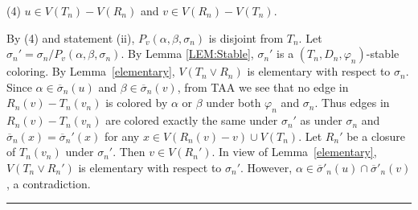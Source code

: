\documentclass[11pt]{article}
\newtheorem{lemma}[theorem]{Lemma}
\newcommand{\TT}{\mathcal {T}}
\newcommand{\phibar}{\overline{\varphi}}
\newcommand{\phiv}{\varphi}
\def\qed{\hfill \rule{4pt}{7pt}}
\begin{document}
(4) $u \in V(T_n)-V(R_n)$ and $v \in V(R_n)-V(T_n)$.
 
By (4) and statement (ii), $P_v(\alpha,\beta,\sigma_n)$ is disjoint from $T_n$. Let $\sigma_n'=\sigma_n/P_v(\alpha,
\beta,\sigma_n)$. By Lemma \ref{LEM:Stable}, $\sigma_n'$ is a $(T_n,D_n,\varphi_n)$-stable coloring.  By Lemma~\ref{elementary},  
$V(T_n\vee R_n)$ is elementary with respect to $\sigma_n$. Since $\alpha \in \overline{\sigma}_n(u)$ and $\beta\in \overline{\sigma}_n(v)$, 
from TAA we see that no edge in $R_n(v)-T_n(v_n)$ is colored by $\alpha$ or $\beta$
under both $\varphi_n$ and $\sigma_n$. Thus edges in $R_n(v)-T_n(v_n)$ are colored exactly the same under 
$\sigma_n'$ as under $\sigma_n$ and $\overline{\sigma}_n(x)= \overline{\sigma}_n'(x)$ for any $x \in  
V(R_n(v)-v) \cup V(T_n)$.  Let $R_n'$ be a closure of $T_n(v_n)$ under $\sigma_n'$. Then $v \in V(R_n')$. In view of 
Lemma~\ref{elementary},  $V(T_n\vee R_n')$ is elementary with respect to $\sigma_n'$. However,  
$\alpha \in \overline{\sigma}'_n(u) \cap \overline{\sigma}'_n(v)$, a contradiction. \qed
\vskip 3mm




\end{document}
